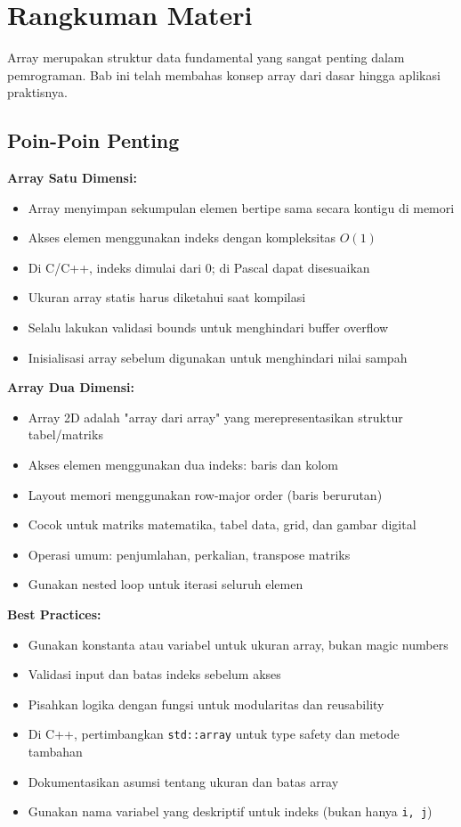 \documentclass[../main.tex]{subfiles}
\begin{document}
\section{Rangkuman Materi}

Array merupakan struktur data fundamental yang sangat penting dalam pemrograman. Bab ini telah membahas konsep array dari dasar hingga aplikasi praktisnya.

\subsection{Poin-Poin Penting}

\textbf{Array Satu Dimensi:}
\begin{itemize}
  \item Array menyimpan sekumpulan elemen bertipe sama secara kontigu di memori
  \item Akses elemen menggunakan indeks dengan kompleksitas \(O(1)\)
  \item Di C/C++, indeks dimulai dari 0; di Pascal dapat disesuaikan
  \item Ukuran array statis harus diketahui saat kompilasi
  \item Selalu lakukan validasi bounds untuk menghindari buffer overflow
  \item Inisialisasi array sebelum digunakan untuk menghindari nilai sampah
\end{itemize}

\textbf{Array Dua Dimensi:}
\begin{itemize}
  \item Array 2D adalah "array dari array" yang merepresentasikan struktur tabel/matriks
  \item Akses elemen menggunakan dua indeks: baris dan kolom
  \item Layout memori menggunakan row-major order (baris berurutan)
  \item Cocok untuk matriks matematika, tabel data, grid, dan gambar digital
  \item Operasi umum: penjumlahan, perkalian, transpose matriks
  \item Gunakan nested loop untuk iterasi seluruh elemen
\end{itemize}

\textbf{Best Practices:}
\begin{itemize}
  \item Gunakan konstanta atau variabel untuk ukuran array, bukan magic numbers
  \item Validasi input dan batas indeks sebelum akses
  \item Pisahkan logika dengan fungsi untuk modularitas dan reusability
  \item Di C++, pertimbangkan \texttt{std::array} untuk type safety dan metode tambahan
  \item Dokumentasikan asumsi tentang ukuran dan batas array
  \item Gunakan nama variabel yang deskriptif untuk indeks (bukan hanya \texttt{i, j})
\end{itemize}
\end{document}
